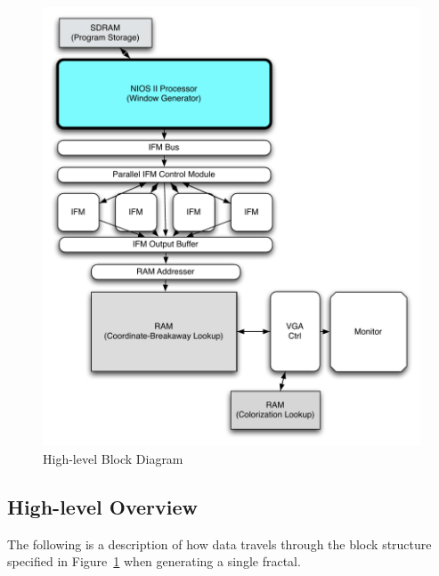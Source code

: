 \documentclass{article}
\begin{document}
\begin{figure}\label{fig:block}
  \centering
	\includegraphics[width=\textwidth]{block_diagrams/top_level.pdf}
  \caption{High-level Block Diagram}
\end{figure}

\subsection{High-level Overview}

The following is a description of how data travels through the block structure specified in Figure~\ref{fig:block} when generating a single fractal.
\end{document}
